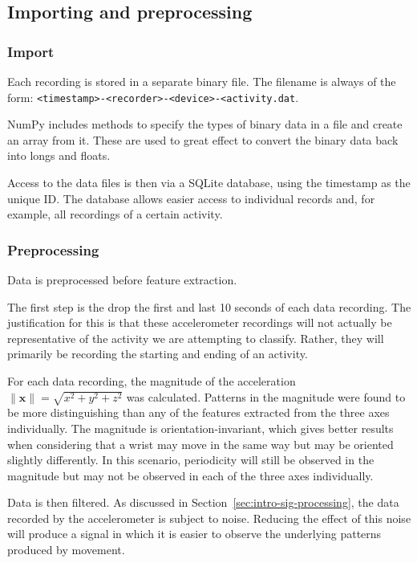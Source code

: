     \subsection{Importing and preprocessing}
      \subsubsection{Import}
        Each recording is stored in a separate binary file. The filename is always of the form: \texttt{<timestamp>-<recorder>-<device>-<activity.dat}. 
        
        NumPy includes methods to specify the types of binary data in a file and create an array from it. These are used to great effect to convert the binary data back into longs and floats.
        
        Access to the data files is then via a SQLite database, using the timestamp as the unique ID. The database allows easier access to individual records and, for example, all recordings of a certain activity.
      \subsubsection{Preprocessing}
        \label{sec:preprocessing}
        Data is preprocessed before feature extraction.
        
        The first step is the drop the first and last 10 seconds of each data recording. The justification for this is that these accelerometer recordings will not actually be representative of the activity we are attempting to classify. Rather, they will primarily be recording the starting and ending of an activity.
        
        For each data recording, the magnitude of the acceleration $\|\mathbf{x}\| = \sqrt{x^2+y^2+z^2}$ was calculated. Patterns in the magnitude were found to be more distinguishing than any of the features extracted from the three axes individually. The magnitude is orientation-invariant, which gives better results when considering that a wrist may move in the same way but may be oriented slightly differently. In this scenario, periodicity will still be observed in the magnitude but may not be observed in each of the three axes individually.
        
        Data is then filtered. As discussed in Section~\ref{sec:intro-sig-processing}, the data recorded by the accelerometer is subject to noise. Reducing the effect of this noise will produce a signal in which it is easier to observe the underlying patterns produced by movement.
        
